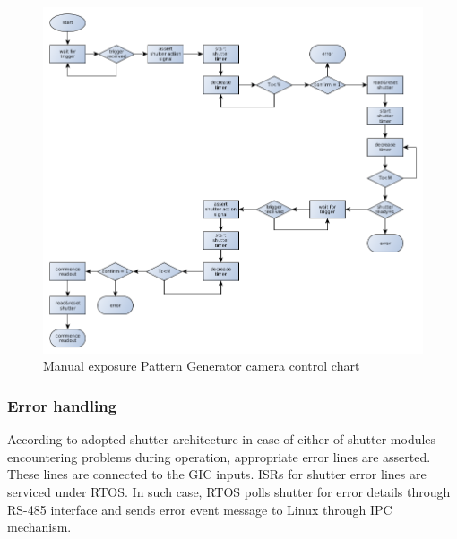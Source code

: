 \begin{description}
\begin{figure}[H]
\centering
\includegraphics[width=\textwidth]{pict_ipc/shut_ctrl_man.png}
\caption{Manual exposure Pattern Generator camera control chart}
\label{fig:shutctrlman}
\end{figure}

\end{description}

\subsubsection{Error handling}
According to adopted shutter architecture in case of either of shutter modules encountering problems during operation, appropriate error lines are asserted. These lines are connected to the GIC inputs. ISRs for shutter error lines are serviced under RTOS. In such case, RTOS polls shutter for error details through RS-485 interface and sends error event message to Linux through IPC mechanism.



